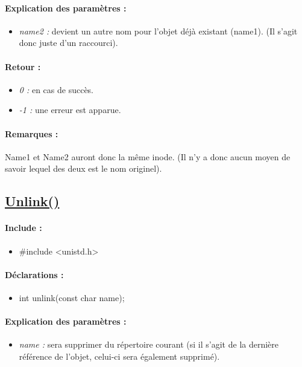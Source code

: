 \documentclass{article}[12pt]
\begin{document}
\paragraph{Explication des paramètres : }
\begin{itemize}
	\item \emph{name2 : } devient un autre nom pour l'objet déjà existant (name1). (Il s'agit donc juste d'un raccourci).
\end{itemize}
\paragraph{Retour : }
\begin{itemize}
	\item \emph{0 : } en cas de succès.
	\item \emph{-1 : } une erreur est apparue.
\end{itemize}
\paragraph{Remarques : }
Name1 et Name2 auront donc la même inode. (Il n'y a donc aucun moyen de savoir lequel des deux est le nom originel).
\subsection{\href{http://jp.barralis.com/linux-man/man2/unlink.2.php}{Unlink()}}
\paragraph{Include : }
\begin{itemize}
	\item \#include <unistd.h>
\end{itemize}
\paragraph{Déclarations : }
\begin{itemize}
	\item int unlink(const char \* name);
\end{itemize}
\paragraph{Explication des paramètres : }
\begin{itemize}
	\item \emph{name : } sera supprimer du répertoire courant (si il s'agit de la dernière référence de l'objet, celui-ci sera également supprimé).
\end{itemize}
\end{document}

